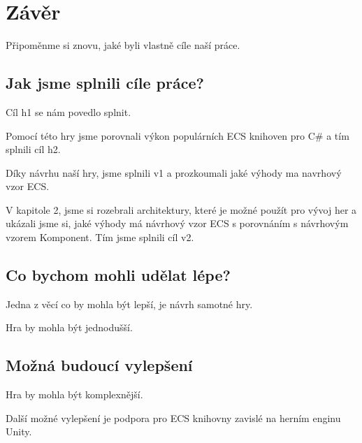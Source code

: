 \chapter{Závěr}
Připoměnme si znovu, jaké byli vlastně cíle naší práce.

\section{Jak jsme splnili cíle práce?}
Cíl h1 se nám povedlo splnit.

Pomocí této hry jsme porovnali výkon populárních ECS knihoven pro C\# a tím splnili cíl h2.

Díky návrhu naší hry, jsme splnili v1 a prozkoumali jaké výhody ma navrhový vzor ECS.

V kapitole 2, jsme si rozebrali architektury, které je možné použít pro vývoj her a ukázali jsme si, jaké výhody má návrhový vzor ECS s porovnáním s návrhovým vzorem Komponent. Tím jsme splnili cíl v2.

\section{Co bychom mohli udělat lépe?}
Jedna z věcí co by mohla být lepší, je návrh samotné hry.

Hra by mohla být jednodušší.

\section{Možná budoucí vylepšení}
Hra by mohla být komplexnější.

Další možné vylepšení je podpora pro ECS knihovny zavislé na herním enginu Unity.

